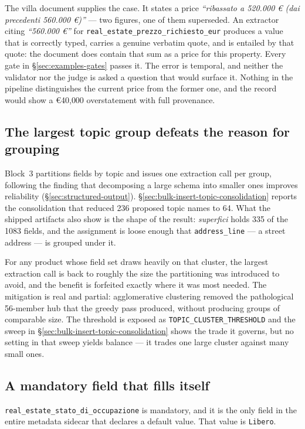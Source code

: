 The villa document supplies the case. It states a price \emph{``ribassato a 520.000 € (dai precedenti 560.000 €)''} --- two figures, one of them superseded. An extractor citing \emph{``560.000 €''} for \texttt{real\_estate\_prezzo\_richiesto\_eur} produces a value that is correctly typed, carries a genuine verbatim quote, and is entailed by that quote: the document does contain that sum as a price for this property. Every gate in \S\ref{sec:examples-gates} passes it. The error is temporal, and neither the validator nor the judge is asked a question that would surface it. Nothing in the pipeline distinguishes the current price from the former one, and the record would show a €40{,}000 overstatement with full provenance.

\subsection{The largest topic group defeats the reason for grouping}

Block~3 partitions fields by topic and issues one extraction call per group, following the finding that decomposing a large schema into smaller ones improves reliability (\S\ref{sec:structured-output}). \S\ref{sec:bulk-insert-topic-consolidation} reports the consolidation that reduced 236 proposed topic names to 64. What the shipped artifacts also show is the shape of the result: \emph{superfici} holds 335 of the 1083 fields, and the assignment is loose enough that \texttt{address\_line} --- a street address --- is grouped under it.

For any product whose field set draws heavily on that cluster, the largest extraction call is back to roughly the size the partitioning was introduced to avoid, and the benefit is forfeited exactly where it was most needed. The mitigation is real and partial: agglomerative clustering removed the pathological 56-member hub that the greedy pass produced, without producing groups of comparable size. The threshold is exposed as \texttt{TOPIC\_CLUSTER\_THRESHOLD} and the sweep in \S\ref{sec:bulk-insert-topic-consolidation} shows the trade it governs, but no setting in that sweep yields balance --- it trades one large cluster against many small ones.

\subsection{A mandatory field that fills itself}

\texttt{real\_estate\_stato\_di\_occupazione} is mandatory, and it is the only field in the entire metadata sidecar that declares a default value. That value is \texttt{Libero}.

